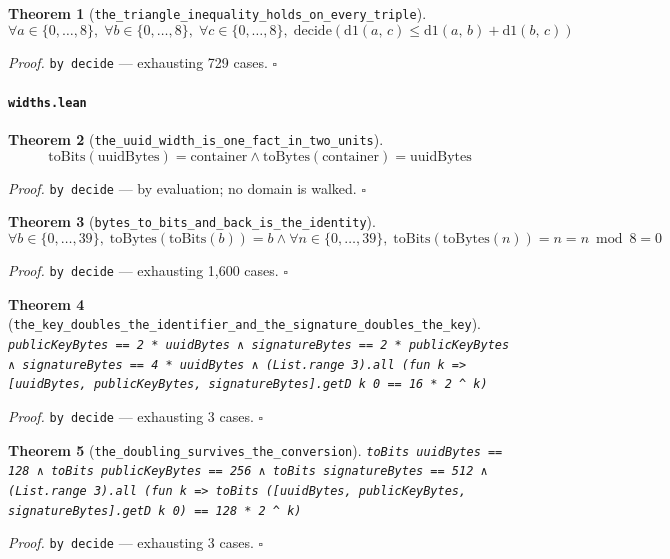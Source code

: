 \documentclass[11pt]{article}
\newtheorem{theorem}{Theorem}[section]
\begin{document}
\begin{theorem}[\texttt{the\_triangle\_inequality\_holds\_on\_every\_triple}]
\[ \forall a \in \{0,\dots,8\},\; \forall b \in \{0,\dots,8\},\; \forall c \in \{0,\dots,8\},\; \mathrm{decide}\mathopen{}\left(\mathrm{d1}\mathopen{}\left(a,\,c\right) \le \mathrm{d1}\mathopen{}\left(a,\,b\right) + \mathrm{d1}\mathopen{}\left(b,\,c\right)\right) \]
\end{theorem}
\noindent\emph{Proof.} \texttt{by decide} --- exhausting 729 cases. \hfill$\square$

\paragraph{\texttt{widths.lean}}

\begin{theorem}[\texttt{the\_uuid\_width\_is\_one\_fact\_in\_two\_units}]
\[ \mathrm{toBits}\mathopen{}\left(\mathrm{uuidBytes}\right) = \mathrm{container} \land \mathrm{toBytes}\mathopen{}\left(\mathrm{container}\right) = \mathrm{uuidBytes} \]
\end{theorem}
\noindent\emph{Proof.} \texttt{by decide} --- by evaluation; no domain is walked. \hfill$\square$

\begin{theorem}[\texttt{bytes\_to\_bits\_and\_back\_is\_the\_identity}]
\[ \forall b \in \{0,\dots,39\},\; \mathrm{toBytes}\mathopen{}\left(\mathrm{toBits}\mathopen{}\left(b\right)\right) = b \land \forall n \in \{0,\dots,39\},\; \mathrm{toBits}\mathopen{}\left(\mathrm{toBytes}\mathopen{}\left(n\right)\right) = n = n \bmod 8 = 0 \]
\end{theorem}
\noindent\emph{Proof.} \texttt{by decide} --- exhausting 1,600 cases. \hfill$\square$

\begin{theorem}[\texttt{the\_key\_doubles\_the\_identifier\_and\_the\_signature\_doubles\_the\_key}]
\texttt{publicKeyBytes == 2 * uuidBytes ∧ signatureBytes == 2 * publicKeyBytes ∧ signatureBytes == 4 * uuidBytes ∧ (List.range 3).all (fun k => [uuidBytes, publicKeyBytes, signatureBytes].getD k 0 == 16 * 2 ^ k)}
\end{theorem}
\noindent\emph{Proof.} \texttt{by decide} --- exhausting 3 cases. \hfill$\square$

\begin{theorem}[\texttt{the\_doubling\_survives\_the\_conversion}]
\texttt{toBits uuidBytes == 128 ∧ toBits publicKeyBytes == 256 ∧ toBits signatureBytes == 512 ∧ (List.range 3).all (fun k => toBits ([uuidBytes, publicKeyBytes, signatureBytes].getD k 0) == 128 * 2 ^ k)}
\end{theorem}
\noindent\emph{Proof.} \texttt{by decide} --- exhausting 3 cases. \hfill$\square$
\end{document}
